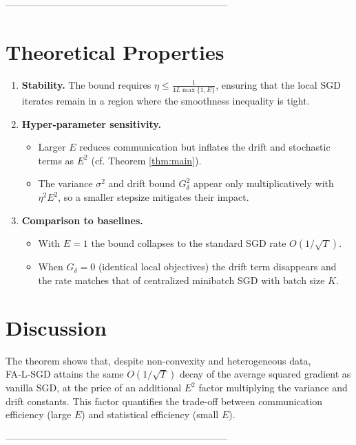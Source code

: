 \documentclass{article}
\begin{document}
---------------------------------------------------------------------

\section*{Theoretical Properties}
\begin{enumerate}
\item \textbf{Stability.}  The bound requires $\eta\le \frac{1}{4L\max\{1,E\}}$,
ensuring that the local SGD iterates remain in a region where the smoothness
inequality is tight.
\item \textbf{Hyper‑parameter sensitivity.}
    \begin{itemize}
        \item Larger $E$ reduces communication but inflates the drift and
        stochastic terms as $E^{2}$ (cf. Theorem \ref{thm:main}).
        \item The variance $\sigma^{2}$ and drift bound $G_{\delta}^{2}$ appear
        only multiplicatively with $\eta^{2}E^{2}$, so a smaller stepsize
        mitigates their impact.
    \end{itemize}
\item \textbf{Comparison to baselines.}
    \begin{itemize}
        \item With $E=1$ the bound collapses to the standard SGD rate
        $O(1/\sqrt{T})$.
        \item When $G_{\delta}=0$ (identical local objectives) the drift term
        disappears and the rate matches that of centralized minibatch SGD with
        batch size $K$.
    \end{itemize}
\end{enumerate}

\section*{Discussion}
The theorem shows that, despite non‑convexity and heterogeneous data,
FA‑L‑SGD attains the same $O(1/\sqrt{T})$ decay of the average squared gradient
as vanilla SGD, at the price of an additional $E^{2}$ factor multiplying the
variance and drift constants.  This factor quantifies the trade‑off between
communication efficiency (large $E$) and statistical efficiency (small $E$).

---------------------------------------------------------------------
\end{document}
